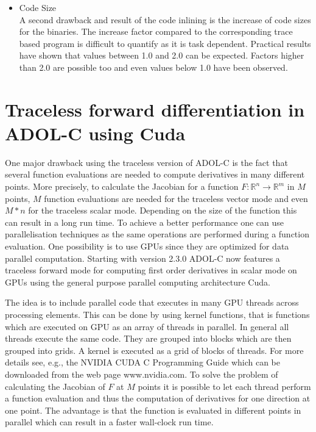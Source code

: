 \documentclass[11pt,twoside]{article}
\begin{document}
\begin{itemize}
\begin{itemize}
      As discussed in the previous sections, the traceless forward mode of
      the ADOL-C package is implemented as inline intended version. Using
      this approach results in a higher source code size, since every
      operation involving at least one {\sf adouble} stands for the
      operation itself as well as for the corresponding derivative
      code after the inlining process. Therefore, the compilation time
      needed for the traceless version may be higher than that of the trace based code. 
    \item Code Size\\
      A second drawback and result of the code inlining is the
      increase of code sizes for the binaries. The increase
      factor compared to the corresponding trace based program is
      difficult to quantify as it is task dependent. Practical results
      have shown that values between 1.0 and 2.0 can be
      expected. Factors higher than 2.0 are possible too and even
      values below 1.0 have been observed. 
    \end{itemize}
\end{itemize}


\section{Traceless forward differentiation in ADOL-C using Cuda}
\label{tracelessCuda}
%
One major drawback using the traceless version of ADOL-C is the fact 
that several function evaluations are needed to compute derivatives
in many different points. More precisely, to calculate the Jacobian for
a function $F:\mathbb{R}^n\rightarrow \mathbb{R}^m$ in $M$ points, $M$
function evaluations are needed for the traceless vector mode and even 
$M*n$ for the traceless scalar mode. Depending on the size of the function 
this can result in a long run time. To achieve a better performance one can
use parallelisation techniques as the same operations are
performed during a function evaluation. One possibility is to use GPUs 
since they are optimized for data parallel computation. Starting with 
version 2.3.0 ADOL-C now features a traceless forward mode for computing 
first order derivatives in scalar mode on GPUs using the 
general purpose parallel computing architecture Cuda. 

The idea is to include parallel code that executes in many GPU threads across
processing elements. This can be done by using kernel functions, that is functions
which are executed on GPU as an array of threads in parallel. In general all 
threads execute the same code. They are grouped into blocks which are then grouped 
into grids. A kernel is executed as a grid of blocks of threads. For more 
details see, e.g., the NVIDIA CUDA C Programming Guide which can be downloaded from 
the web page {\sf www.nvidia.com}. To solve the problem of calculating 
the Jacobian of $F$ at $M$ points it is possible to let each thread perform a 
function evaluation and thus the computation of derivatives for one direction 
at one point. The advantage is that the function is evaluated in different points
in parallel which can result in a faster wall-clock run time.
\end{document}
